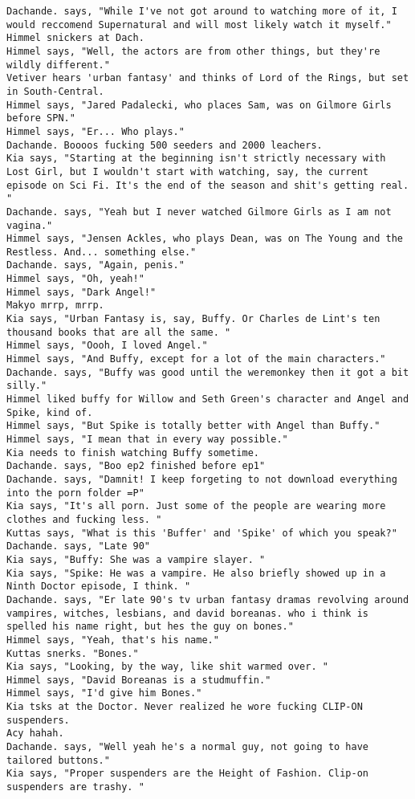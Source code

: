 \begin{verbatim}
Dachande. says, "While I've not got around to watching more of it, I would reccomend Supernatural and will most likely watch it myself."
Himmel snickers at Dach.
Himmel says, "Well, the actors are from other things, but they're wildly different."
Vetiver hears 'urban fantasy' and thinks of Lord of the Rings, but set in South-Central.
Himmel says, "Jared Padalecki, who places Sam, was on Gilmore Girls before SPN."
Himmel says, "Er... Who plays."
Dachande. Boooos fucking 500 seeders and 2000 leachers.
Kia says, "Starting at the beginning isn't strictly necessary with Lost Girl, but I wouldn't start with watching, say, the current episode on Sci Fi. It's the end of the season and shit's getting real. "
Dachande. says, "Yeah but I never watched Gilmore Girls as I am not vagina."
Himmel says, "Jensen Ackles, who plays Dean, was on The Young and the Restless. And... something else."
Dachande. says, "Again, penis."
Himmel says, "Oh, yeah!"
Himmel says, "Dark Angel!"
Makyo mrrp, mrrp.
Kia says, "Urban Fantasy is, say, Buffy. Or Charles de Lint's ten thousand books that are all the same. "
Himmel says, "Oooh, I loved Angel."
Himmel says, "And Buffy, except for a lot of the main characters."
Dachande. says, "Buffy was good until the weremonkey then it got a bit silly."
Himmel liked buffy for Willow and Seth Green's character and Angel and Spike, kind of.
Himmel says, "But Spike is totally better with Angel than Buffy."
Himmel says, "I mean that in every way possible."
Kia needs to finish watching Buffy sometime.
Dachande. says, "Boo ep2 finished before ep1"
Dachande. says, "Damnit! I keep forgeting to not download everything into the porn folder =P"
Kia says, "It's all porn. Just some of the people are wearing more clothes and fucking less. "
Kuttas says, "What is this 'Buffer' and 'Spike' of which you speak?"
Dachande. says, "Late 90"
Kia says, "Buffy: She was a vampire slayer. "
Kia says, "Spike: He was a vampire. He also briefly showed up in a Ninth Doctor episode, I think. "
Dachande. says, "Er late 90's tv urban fantasy dramas revolving around vampires, witches, lesbians, and david boreanas. who i think is spelled his name right, but hes the guy on bones."
Himmel says, "Yeah, that's his name."
Kuttas snerks. "Bones."
Kia says, "Looking, by the way, like shit warmed over. "
Himmel says, "David Boreanas is a studmuffin."
Himmel says, "I'd give him Bones."
Kia tsks at the Doctor. Never realized he wore fucking CLIP-ON suspenders.
Acy hahah.
Dachande. says, "Well yeah he's a normal guy, not going to have tailored buttons."
Kia says, "Proper suspenders are the Height of Fashion. Clip-on suspenders are trashy. "

\end{verbatim}
